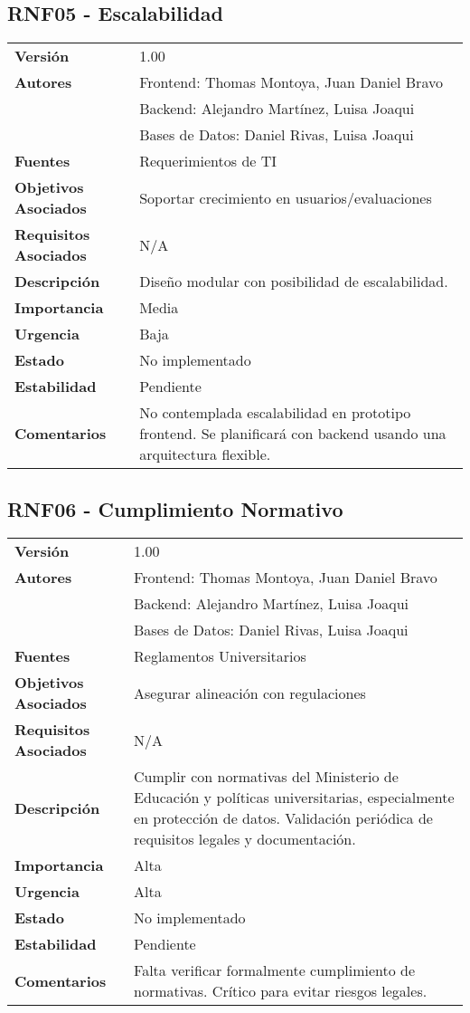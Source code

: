 \documentclass{article}
\begin{document}
\subsection*{RNF05 - Escalabilidad}
\begin{longtable}{>{\bfseries}l p{}}
Versión & 1.00 \\
Autores & Frontend: Thomas Montoya, Juan Daniel Bravo \\
        & Backend: Alejandro Martínez, Luisa Joaqui \\
        & Bases de Datos: Daniel Rivas, Luisa Joaqui \\
Fuentes & Requerimientos de TI \\
Objetivos Asociados & Soportar crecimiento en usuarios/evaluaciones \\
Requisitos Asociados & N/A \\
Descripción & Diseño modular con posibilidad de escalabilidad. \\
Importancia & Media \\
Urgencia & Baja \\
Estado & No implementado \\
Estabilidad & Pendiente \\
Comentarios & No contemplada escalabilidad en prototipo frontend. Se planificará con backend usando una arquitectura flexible. \\
\end{longtable}

\subsection*{RNF06 - Cumplimiento Normativo}
\begin{longtable}{>{\bfseries}l p{}}
Versión & 1.00 \\
Autores & Frontend: Thomas Montoya, Juan Daniel Bravo \\
        & Backend: Alejandro Martínez, Luisa Joaqui \\
        & Bases de Datos: Daniel Rivas, Luisa Joaqui \\
Fuentes & Reglamentos Universitarios \\
Objetivos Asociados & Asegurar alineación con regulaciones \\
Requisitos Asociados & N/A \\
Descripción & Cumplir con normativas del Ministerio de Educación y políticas universitarias, especialmente en protección de datos. Validación periódica de requisitos legales y documentación. \\
Importancia & Alta \\
Urgencia & Alta \\
Estado & No implementado \\
Estabilidad & Pendiente \\
Comentarios & Falta verificar formalmente cumplimiento de normativas. Crítico para evitar riesgos legales. \\
\end{longtable}
\end{document}
